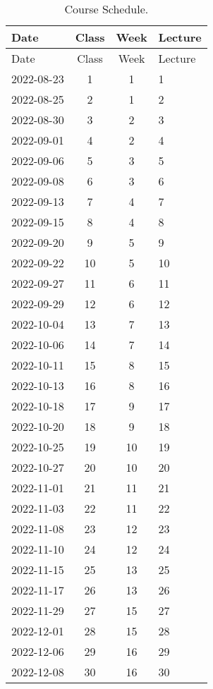 \documentclass[11pt,]{article}
\begin{document}
\begin{longtable}[]{@{}lccl@{}}
\caption{Course Schedule.}\tabularnewline
\toprule
Date & Class & Week & Lecture \\
\midrule
\endfirsthead
\toprule
Date & Class & Week & Lecture \\
\midrule
\endhead
2022-08-23 & 1 & 1 & 1 \\
2022-08-25 & 2 & 1 & 2 \\
2022-08-30 & 3 & 2 & 3 \\
2022-09-01 & 4 & 2 & 4 \\
2022-09-06 & 5 & 3 & 5 \\
2022-09-08 & 6 & 3 & 6 \\
2022-09-13 & 7 & 4 & 7 \\
2022-09-15 & 8 & 4 & 8 \\
2022-09-20 & 9 & 5 & 9 \\
2022-09-22 & 10 & 5 & 10 \\
2022-09-27 & 11 & 6 & 11 \\
2022-09-29 & 12 & 6 & 12 \\
2022-10-04 & 13 & 7 & 13 \\
2022-10-06 & 14 & 7 & 14 \\
2022-10-11 & 15 & 8 & 15 \\
2022-10-13 & 16 & 8 & 16 \\
2022-10-18 & 17 & 9 & 17 \\
2022-10-20 & 18 & 9 & 18 \\
2022-10-25 & 19 & 10 & 19 \\
2022-10-27 & 20 & 10 & 20 \\
2022-11-01 & 21 & 11 & 21 \\
2022-11-03 & 22 & 11 & 22 \\
2022-11-08 & 23 & 12 & 23 \\
2022-11-10 & 24 & 12 & 24 \\
2022-11-15 & 25 & 13 & 25 \\
2022-11-17 & 26 & 13 & 26 \\
2022-11-29 & 27 & 15 & 27 \\
2022-12-01 & 28 & 15 & 28 \\
2022-12-06 & 29 & 16 & 29 \\
2022-12-08 & 30 & 16 & 30 \\
\bottomrule
\end{longtable}
\end{document}
